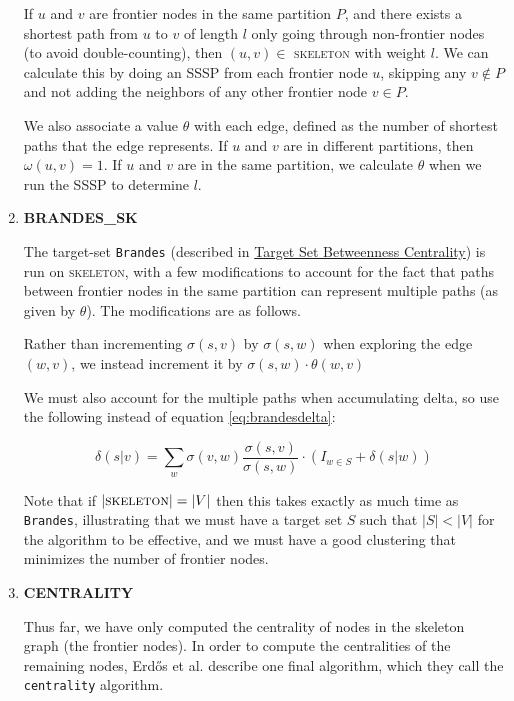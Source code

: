 \documentclass[12pt,a4paper,twoside,openright]{report}
\newcommand{\ttt}[1]{\texttt{#1}}
\newcommand{\erdos}{Erd\H{o}s }
\begin{document}
\begin{enumerate}[label = \textbf{\arabic*.}]
		If $u$ and $v$ are frontier nodes in the same partition $P$, and there exists a shortest path from $u$ to $v$ of length $l$ only going through non-frontier nodes (to avoid double-counting), then $(u,v) \in$ \textsc{skeleton} with weight $l$. We can calculate this by doing an SSSP from each frontier node $u$, skipping any $v \not \in P$ and not adding the neighbors of any other frontier node $v \in P$.
		
		We also associate a value $\theta$ with each edge, defined as the number of shortest paths that the edge represents. If $u$ and $v$ are in different partitions, then $\omega(u,v) = 1$. If $u$ and $v$ are in the same partition, we calculate $\theta$ when we run the SSSP to determine $l$.
		
		
		\item \textbf{BRANDES\_SK}
		
		The target-set \ttt{Brandes} (described in \hyperref[sec:targetset]{Target Set Betweenness Centrality}) is run on \textsc{skeleton}, with a few modifications to account for the fact that paths between frontier nodes in the same partition can represent multiple paths (as given by $\theta$). The modifications are as follows.
		
		Rather than incrementing $\sigma(s,v)$ by $\sigma(s,w)$ when exploring the edge $(w,v)$, we instead increment it by $\sigma(s,w)\cdot \theta(w,v)$
		
		
		We must also account for the multiple paths when accumulating delta, so use the following instead of equation \ref{eq:brandesdelta}:
		
		\begin{equation}\label{brandes_sk}
			\delta(s|v) = \sum_{w} \sigma(v,w)\frac{\sigma(s,v)}{\sigma(s,w)}\cdot (I_{w\in S}+\delta(s|w))
		\end{equation}
		
		Note that if $|\textsc{skeleton}| = |V|$ then this takes exactly as much time as \ttt{Brandes}, illustrating that we must have a target set $S$ such that $|S| < |V|$ for the algorithm to be effective, and we must have a good clustering that minimizes the number of frontier nodes.
		
		\item \textbf{CENTRALITY}
		
		Thus far, we have only computed the centrality of nodes in the skeleton graph (the frontier nodes). In order to compute the centralities of the remaining nodes, \erdos et al. describe one final algorithm, which they call the \ttt{centrality} algorithm.
		

\end{enumerate}
\end{document}
